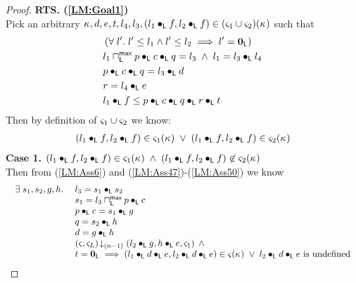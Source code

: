 \begin{lemma}[]
\begin{proof}
\noindent\textbf{RTS. (\ref{LM:Goal1})}\\
Pick an arbitrary $\kappa_{}, d, e, t, l_4, l_3, (l_1 \bullet_{\textsf{L}} f, l_2 \bullet_{\textsf{L}} f) \in (\varsigma_{1} \cup \varsigma_{2})(\kappa_{})$ such that
\begin{align}
	& \left(\forall\; l'.\; l' \leq l_1 \land l' \leq l_2 \implies l' = \mathbf{0}_{\textsf{L}}\right)\label{LM:Ass47}\\
	& l_1 \sqcap_{\textsf{L}}^{\textsf{max}}  p \bullet_{\textsf{L}} c \bullet_{\textsf{L}} q = l_3 \;\land\; l_1 = l_3 \bullet_{\textsf{L}} l_4 \label{LM:Ass48}\\
	& p \bullet_{\textsf{L}} c \bullet_{\textsf{L}} q = l_3 \bullet_{\textsf{L}} d \label{LM:Ass49}\\
	& r = l_4 \bullet_{\textsf{L}} e \label{LM:Ass50}\\
	& l_1 \bullet_{\textsf{L}} f \leq p \bullet_{\textsf{L}} c \bullet_{\textsf{L}} q \bullet_{\textsf{L}} r \bullet_{\textsf{L}} t\label{LM:Ass51}
\end{align}
%
Then by definition of $\varsigma_{1} \cup \varsigma_{2}$ we know:
%
\begin{align}
	(l_1 \bullet_{\textsf{L}} f, l_2 \bullet_{\textsf{L}} f) \in \varsigma_{1}(\kappa_{}) \;\lor\; (l_1 \bullet_{\textsf{L}} f, l_2 \bullet_{\textsf{L}} f) \in \varsigma_{2}(\kappa_{}) \label{LM:Ass61}
\end{align}
%
\textbf{Case 1.} $(l_1 \bullet_{\textsf{L}} f, l_2 \bullet_{\textsf{L}} f) \in \varsigma_{1}(\kappa_{}) \;\land\; (l_1 \bullet_{\textsf{L}} f, l_2 \bullet_{\textsf{L}} f) \not\in \varsigma_{2}(\kappa_{})$\\
%
Then from (\ref{LM:Ass6}) and (\ref{LM:Ass47})-(\ref{LM:Ass50}) we know
%
\begin{align}
\begin{array}{l}
\begin{array}{l l}
	\exists\; s_1, s_2, g, h.\; & l_3 = s_1 \bullet_{\textsf{L}} s_2\\
	& s_1 = l_3 \sqcap_{\textsf{L}}^{\textsf{max}} p \bullet_{\textsf{L}} c\\
	& p \bullet_{\textsf{L}} c = s_1 \bullet_{\textsf{L}} g\\
	& q = s_2 \bullet_{\textsf{L}} h\\
	& d = g \bullet_{\textsf{L}} h\\
	& \left(\varsigma_{}, \varsigma_{L}\right) \!\downarrow_{(n-1)} \left(l_2 \bullet_{\textsf{L}} g, h \bullet_{\textsf{L}} e, \varsigma_{1}\right) \;\land \\
	& t = \mathbf{0}_{\textsf{L}} \implies (l_1 \bullet_{\textsf{L}} d \bullet_{\textsf{L}} e, l_2 \bullet_{\textsf{L}} d \bullet_{\textsf{L}} e) \in \varsigma_{}(\kappa_{}) \;\lor\; l_2 \bullet_{\textsf{L}} d \bullet_{\textsf{L}} e \text{ is undefined}
\end{array}\\
\end{array}	\label{LMN:Ass1}
\end{align}

\end{proof}
\end{lemma}
